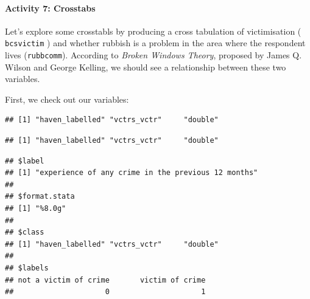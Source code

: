 \documentclass[
]{book}
\newenvironment{Shaded}{\begin{snugshade}}{\end{snugshade}}
\newcommand{\CommentTok}[1]{\textcolor[rgb]{0.56,0.35,0.01}{\textit{#1}}}
\newcommand{\FunctionTok}[1]{\textcolor[rgb]{0.00,0.00,0.00}{#1}}
\newcommand{\NormalTok}[1]{#1}
\newcommand{\SpecialCharTok}[1]{\textcolor[rgb]{0.00,0.00,0.00}{#1}}
\begin{document}
\hypertarget{activity-7-crosstabs}{%
\paragraph{Activity 7: Crosstabs}\label{activity-7-crosstabs}}

Let's explore some crosstabls by producing a cross tabulation of victimisation ( \texttt{bcsvictim} ) and whether rubbish is a problem in the area where the respondent lives (\texttt{rubbcomm}). According to \emph{Broken Windows Theory}, proposed by James Q. Wilson and George Kelling, we should see a relationship between these two variables.

First, we check out our variables:

\begin{Shaded}
\end{Shaded}

\begin{verbatim}
## [1] "haven_labelled" "vctrs_vctr"     "double"
\end{verbatim}

\begin{Shaded}
\end{Shaded}

\begin{verbatim}
## [1] "haven_labelled" "vctrs_vctr"     "double"
\end{verbatim}

\begin{Shaded}
\end{Shaded}

\begin{verbatim}
## $label
## [1] "experience of any crime in the previous 12 months"
## 
## $format.stata
## [1] "%8.0g"
## 
## $class
## [1] "haven_labelled" "vctrs_vctr"     "double"        
## 
## $labels
## not a victim of crime       victim of crime 
##                     0                     1
\end{verbatim}
\end{document}
